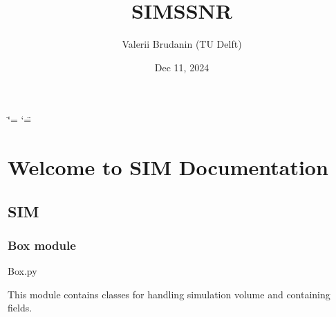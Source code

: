 \documentclass[letterpaper,10pt,english]{sphinxmanual}
\title{SIMSSNR}
\date{Dec 11, 2024}
\author{Valerii Brudanin (TU Delft)}
\begin{document}
\ifdefined\shorthandoff
  \ifnum\catcode`\=\string=\active\shorthandoff{=}\fi
  \ifnum\catcode`\"=\active{}\fi
\fi

\pagestyle{empty}
\sphinxmaketitle
\pagestyle{plain}
\sphinxtableofcontents
\pagestyle{normal}
\label{\detokenize{index::doc}}



\chapter{Welcome to SIM Documentation}
\label{\detokenize{index:welcome-to-sim-documentation}}
\sphinxstepscope


\section{SIM}
\label{\detokenize{source/modules:sim}}\label{\detokenize{source/modules::doc}}
\sphinxstepscope


\subsection{Box module}
\label{\detokenize{source/Box:module-Box}}\label{\detokenize{source/Box:box-module}}\label{\detokenize{source/Box::doc}}
\sphinxAtStartPar
Box.py

\sphinxAtStartPar
This module contains classes for handling simulation volume and containing fields.

\end{document}
